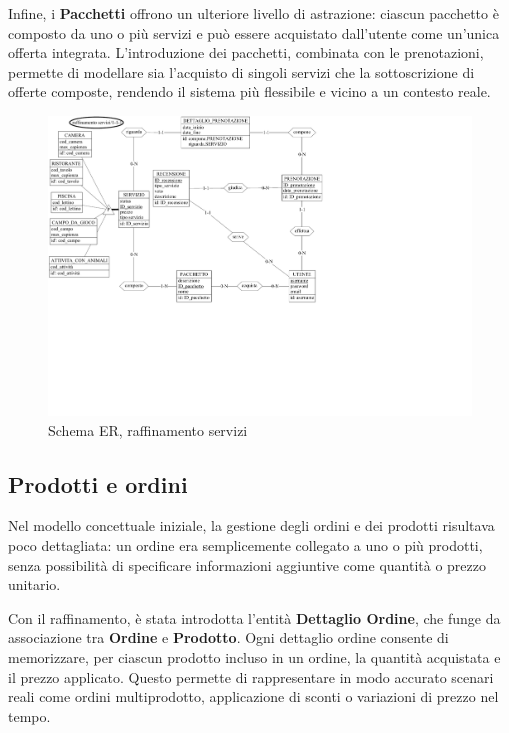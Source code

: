 \documentclass[a4paper,12pt]{report}
\begin{document}
\vspace{\baselineskip}
Infine, i \textbf{Pacchetti} offrono un ulteriore livello di astrazione: ciascun pacchetto è composto da uno o più servizi e può essere
acquistato dall'utente come un'unica offerta integrata. L'introduzione dei pacchetti, combinata con le prenotazioni, permette
di modellare sia l'acquisto di singoli servizi che la sottoscrizione di offerte composte, rendendo il sistema più flessibile e
vicino a un contesto reale.

\begin{figure}[H]
	\centering
	\includegraphics[width=\textwidth, trim=0 200pt 290pt 0, clip]{./pdf/raffinamento servizi.pdf}
	\caption{Schema ER, raffinamento servizi}
	\label{fig:raffinamento-servizi}
\end{figure}

\newpage
\subsection{Prodotti e ordini}
Nel modello concettuale iniziale, la gestione degli ordini e dei prodotti risultava poco dettagliata: un ordine era
semplicemente collegato a uno o più prodotti, senza possibilità di specificare informazioni aggiuntive come quantità o
prezzo unitario.

\vspace{\baselineskip}
Con il raffinamento, è stata introdotta l'entità \textbf{Dettaglio Ordine}, che funge da associazione tra \textbf{Ordine}
e \textbf{Prodotto}. Ogni dettaglio ordine consente di memorizzare, per ciascun prodotto incluso in un ordine, la quantità
acquistata e il prezzo applicato. Questo permette di rappresentare in modo accurato scenari reali come ordini
multiprodotto, applicazione di sconti o variazioni di prezzo nel tempo.
\end{document}
